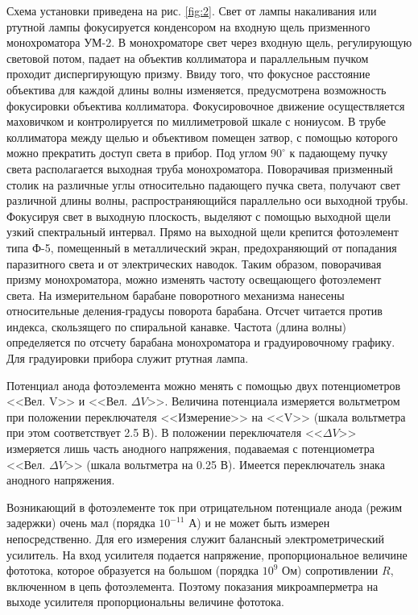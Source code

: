 Схема установки приведена на рис. \ref{fig:2}. Свет от лампы накаливания или ртутной лампы фокусируется конденсором на входную щель призменного монохроматора УМ-2. В монохроматоре свет через входную щель, регулирующую световой потом, падает на объектив коллиматора и параллельным пучком проходит диспергирующую призму. Ввиду того, что фокусное расстояние объектива для каждой длины волны изменяется, предусмотрена возможность фокусировки объектива коллиматора. Фокусировочное движение осуществляется маховичком и контролируется по миллиметровой шкале с нониусом. В трубе коллиматора между щелью и объективом помещен затвор, с помощью которого можно прекратить доступ света в прибор. Под углом $90^{\circ}$ к падающему пучку света располагается выходная труба монохроматора. Поворачивая призменный столик на различные углы относительно падающего пучка света, получают свет различной длины волны, распространяющийся параллельно оси выходной трубы. Фокусируя свет в выходную плоскость, выделяют с помощью выходной щели узкий спектральный интервал. Прямо на выходной щели крепится фотоэлемент типа Ф-5, помещенный в металлический экран, предохраняющий от попадания паразитного света и от электрических наводок. Таким образом, поворачивая призму монохроматора, можно изменять частоту освещающего фотоэлемент света. На измерительном барабане поворотного механизма нанесены относительные деления-градусы поворота барабана. Отсчет читается против индекса, скользящего по спиральной канавке. Частота (длина волны) определяется по отсчету барабана монохроматора и градуировочному графику. Для градуировки прибора служит ртутная лампа.

Потенциал анода фотоэлемента можно менять с помощью двух потенциометров <<Вел. V>> и <<Вел. $\Delta V$>>. Величина потенциала измеряется вольтметром при положении переключателя <<Измерение>> на <<V>> (шкала вольтметра при этом соответствует 2.5 В). В положении переключателя <<$\Delta V$>> измеряется лишь часть анодного напряжения, подаваемая с потенциометра <<Вел. $\Delta V$>> (шкала вольтметра на 0.25 В). Имеется переключатель знака анодного напряжения.

Возникающий в фотоэлементе ток при отрицательном потенциале анода (режим задержки) очень мал (порядка $10^{-11}$ А) и не может быть измерен непосредственно. Для его измерения служит балансный электрометрический усилитель. На вход усилителя подается напряжение, пропорциональное величине фототока, которое образуется на большом (порядка $10^9$ Ом) сопротивлении $R$, включенном в цепь фотоэлемента. Поэтому показания микроамперметра на выходе усилителя пропорциональны величине фототока.

